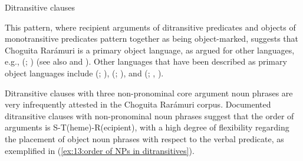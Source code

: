 \ea\label{ex:13:ditransitive clauses}
{Ditransitive clauses}\\

    \z
\z


This pattern, where recipient arguments of ditransitive predicates and objects of monotransitive predicates pattern together as being object-marked, suggests that Choguita Rarámuri is a primary object language, as argued for other  languages, e.g.,  (; \citealt{comrie1982grammatical}) (see also \citealt{dryer1986primary} and \citealt{dryer2007clause}). Other  languages that have been described as primary object languages include  (; \citealt{soto2002some}),  (; \citealt{salido2007voz}), and  (; \citealt{felix2000relaciones}, \citealt{guerrero2004yaqui}).

Ditransitive clauses with three non-pronominal core argument noun phrases are very infrequently attested in the Choguita Rarámuri corpus. Documented ditransitive clauses with non-pronominal noun phrases suggest that the order of arguments is S-T(heme)-R(ecipient), with a high degree of flexibility regarding the placement of object noun phrases with respect to the verbal predicate, as exemplified in (\ref{ex:13:order of NPs in ditransitives}).


